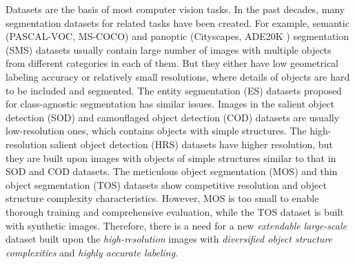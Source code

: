 \documentclass[10pt,twocolumn,letterpaper]{article}
\begin{document}
Datasets are the basis of most computer vision tasks. 
In the past decades, many segmentation datasets for related tasks have been created. For example, semantic (PASCAL-VOC\cite{everingham2010pascal}, MS-COCO\cite{lin2014microsoft}) and panoptic (Cityscapes\cite{Cordts2016Cityscapes}, ADE20K \cite{zhou2017scene}) segmentation (SMS) datasets usually contain large number of images with multiple objects from different categories in each of them. 
But they either have low geometrical labeling accuracy or relatively small resolutions, where details of objects are hard to be included and segmented. 
The entity segmentation (ES) \cite{qi2021open} datasets proposed for class-agnostic segmentation has similar issues. Images in the salient object detection (SOD) \cite{movahedi2010design, li2014secrets, yang2013saliency, DBLP:journals/pami/ChengMHTH15, wang2017learning} and camouflaged object detection (COD) \cite{fan2020camouflaged} datasets are usually low-resolution ones, which contains objects with simple structures. The high-resolution salient object detection (HRS) \cite{zeng2019towards,perazzi2016benchmark} datasets have higher resolution, but they are built upon images with objects of simple structures similar to that in SOD and COD datasets. The meticulous object segmentation (MOS) \cite{yang2020meticulous} and thin object segmentation (TOS) \cite{liew2021deep} datasets show competitive resolution and object structure complexity characteristics. However, MOS is too small to enable thorough training and comprehensive evaluation, while the TOS dataset is built with synthetic images. 
Therefore, there is a need for a new \textit{extendable} \textit{large-scale} dataset built upon the \textit{high-resolution} images with \textit{diversified object structure complexities} and \textit{highly accurate labeling}.
\end{document}
